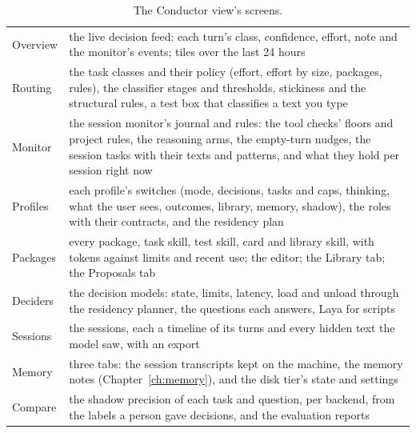 \begin{table}[htbp]
\centering\small
\caption{The Conductor view's screens.}\label{tab:conductor-screens}
\begin{tabularx}{\linewidth}{@{}L{.14\linewidth}Y@{}}
\toprule
{} &  \\
\midrule
Overview & the live decision feed: each turn's class, confidence, effort, note and the monitor's events; tiles over the last 24 hours \\
Routing & the task classes and their policy (effort, effort by size, packages, rules), the classifier stages and thresholds, stickiness and the structural rules, a test box that classifies a text you type \\
Monitor & the session monitor's journal and rules: the tool checks' floors and project rules, the reasoning arms, the empty-turn nudges, the session tasks with their texts and patterns, and what they hold per session right now \\
Profiles & each profile's switches (mode, decisions, tasks and caps, thinking, what the user sees, outcomes, library, memory, shadow), the roles with their contracts, and the residency plan \\
Packages & every package, task skill, test skill, card and library skill, with tokens against limits and recent use; the editor; the Library tab; the Proposals tab \\
Deciders & the decision models: state, limits, latency, load and unload through the residency planner, the questions each answers, Laya for scripts \\
Sessions & the sessions, each a timeline of its turns and every hidden text the model saw, with an export \\
Memory & three tabs: the session transcripts kept on the machine, the memory notes (Chapter~\ref{ch:memory}), and the disk tier's state and settings \\
Compare & the shadow precision of each task and question, per backend, from the labels a person gave decisions, and the evaluation reports \\
\bottomrule
\end{tabularx}
\end{table}


